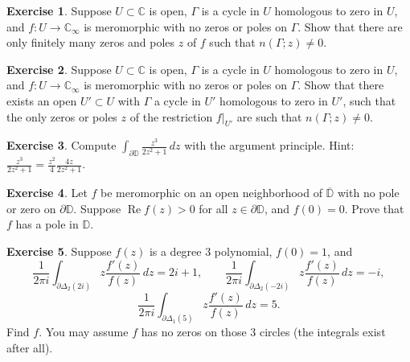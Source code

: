 \documentclass[12pt,openany]{book}
\renewcommand{\Re}{\operatorname{Re}}
\newcommand{\C}{{\mathbb{C}}}
\newcommand{\D}{{\mathbb{D}}}
\theoremstyle{plain}
\theoremstyle{remark}
\theoremstyle{definition}
\newenvironment{exbox}{%
    \def\FrameCommand{\vrule width 1pt \relax\hspace{10pt}}%
    \MakeFramed{\advance\hsize-\width\FrameRestore}%
}{%
    \endMakeFramed
}
\theoremstyle{exercise}
\newtheorem{exercise}{Exercise}[section]
\theoremstyle{example}
\begin{document}
\begin{exbox}
\begin{exercise}
Suppose $U \subset \C$ is open, $\Gamma$ is a cycle in $U$
homologous to zero in $U$,
and $f \colon U \to \C_\infty$ is meromorphic with no zeros or poles on $\Gamma$.
Show that there are only finitely many zeros and poles $z$ of $f$
such that $n(\Gamma;z) \not= 0$.
\end{exercise}

\begin{exercise}
Suppose $U \subset \C$ is open, $\Gamma$ is a cycle in $U$
homologous to zero in $U$,
and $f \colon U \to \C_\infty$ is meromorphic with
no zeros or poles on $\Gamma$.
Show that there exists an open $U' \subset U$
with $\Gamma$ a cycle in $U'$ homologous to zero in $U'$, such that
the only zeros or poles $z$ of the restriction $f|_{U'}$
are such that $n(\Gamma;z) \not= 0$.
\end{exercise}

\begin{exercise}
Compute $\int_{\partial \D} \frac{z^3}{2 z^2+1} \, dz$ with the argument
principle.  Hint: $\frac{z^3}{2 z^2+1}=\frac{z^2}{4} \frac{4z}{2z^2+1}$.
\end{exercise}

\begin{exercise}
Let $f$ be meromorphic on an open neighborhood of $\overline{\D}$
with no pole or zero on $\partial \D$.  Suppose $\Re f(z) >
0$ for all $z \in \partial \D$, and $f(0) = 0$.  Prove that $f$ has a pole
in $\D$.
\end{exercise}

\begin{exercise}
Suppose $f(z)$ is a degree $3$ polynomial, $f(0)=1$, and
\begin{equation*}
\frac{1}{2\pi i}
\int_{\partial \Delta_2(2i)} z \frac{f'(z)}{f(z)} \, dz = 2i+1 ,
\qquad
\frac{1}{2\pi i}
\int_{\partial \Delta_2(-2i)} z \frac{f'(z)}{f(z)} \, dz = -i ,
\end{equation*}
\begin{equation*}
\frac{1}{2\pi i}
\int_{\partial \Delta_1(5)} z \frac{f'(z)}{f(z)} \, dz = 5 .
\end{equation*}
Find $f$.  You may assume $f$ has no zeros on those $3$ circles
(the integrals exist after all).
\end{exercise}


\end{exbox}
\end{document}
